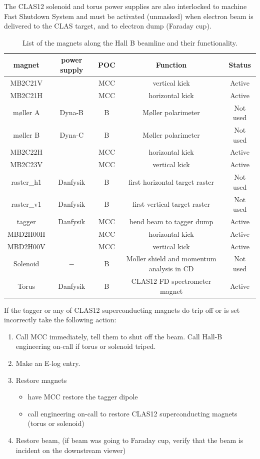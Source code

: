 \documentclass[12pt]{article}
\begin{document}
The CLAS12 solenoid and torus power supplies are also interlocked to machine Fast Shutdown System and must be activated (unmasked) when  electron beam is delivered to the CLAS target, and to electron dump (Faraday cup). 

\begin{table}[tbhp]
\vspace{0.3cm}
{\centering \begin{tabular}{|c|c|c|c|c|}
\hline 
magnet&
power supply&
POC&
Function&
Status\\
\hline 
\hline 
MB2C21V&
&
MCC&
vertical kick&
Active\\
\hline 
MB2C21H&
&
MCC&
horizontal kick&
Active\\
\hline 
m{\o}ller A&
Dyna-B&
B&
M{\o}ller polarimeter&
Not used\\
\hline 
m{\o}ller B&
Dyna-C&
B&
M{\o}ller polarimeter&
Not used\\
\hline 
MB2C22H&
&
MCC&
horizontal kick&
Active\\
\hline 
MB2C23V&
&
MCC&
vertical kick&
Active\\
\hline 
raster\_h1&
Danfysik&
B&
first horizontal target raster&
Not used\\
\hline 
raster\_v1&
Danfysik&
B&
first vertical target raster&
Not used\\
\hline 
tagger&
Danfysik&
MCC&
bend beam to tagger dump&
Active\\
\hline 
MBD2H00H&
&
MCC&
horizontal kick&
Active\\
\hline 
MBD2H00V&
&
MCC&
vertical kick&
Active\\
\hline 
Solenoid&
$-$&
B&
Moller shield and momentum analysis in CD&
Not used\\
\hline 
Torus&
Danfysik&
B&
CLAS12 FD spectrometer magnet&
Active\\
\hline 
\end{tabular}\par}
\vspace{0.3cm}


\caption{List of the magnets along the Hall B beamline and their functionality.\label{magnets}}
\end{table} 

If the tagger or any of CLAS12 superconducting magnets do trip off or is set incorrectly take the following action:

\begin{enumerate}
\item Call MCC immediately, tell them to shut off the beam. Call Hall-B engineering on-call if torus or solenoid triped.
\item Make an E-log entry.
\item Restore magnets 
\begin{itemize}
\item have MCC restore the tagger dipole 
\item call engineering on-call to restore CLAS12 superconducting magnets (torus or solenoid)
\end{itemize}
\item Restore beam, (if beam was going to Faraday cup, verify that the beam is incident on the downstream viewer)
\end{enumerate}
\end{document}
